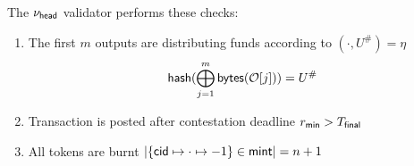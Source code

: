 \noindent The $\nu_\mathsf{head}$ validator performs these checks:
\begin{enumerate}
  \item The first $m$ outputs are distributing funds according to
        $(\cdot, U^{\#}) = \eta$
        \[
        \mathsf{hash}(\bigoplus_{j=1}^{m} \mathsf{bytes}(\mathcal{O}[j])) = U^{\#}
        \]
  \item Transaction is posted after contestation deadline $r_{\mathsf{min}} > T_{\mathsf{final}}$
  \item All tokens are burnt
        $|\{\mathsf{cid} \mapsto \cdot \mapsto -1\} \in \mathsf{mint}| = n + 1$
\end{enumerate}

